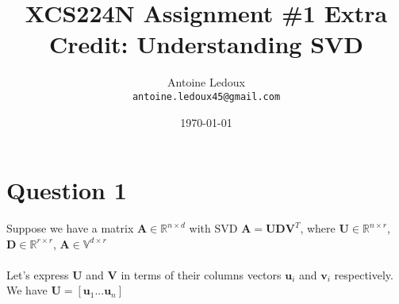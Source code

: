 \documentclass{article}
\title{XCS224N Assignment \#1 Extra Credit:
Understanding SVD } %
\author{Antoine Ledoux\\ \texttt{antoine.ledoux45@gmail.com}} %
\date{\today} %
\begin{document}
\maketitle %



\section{Question 1} %
\let\oldhat\hat
Suppose we have a matrix $\mathbf{A} \in \mathbb{R}^{n \times d} $ with SVD $\mathbf{A} = \mathbf{U} \mathbf{D} \mathbf{V} ^T$, where $\mathbf{U} \in \mathbb{R}^{n \times r} $, $\mathbf{D} \in \mathbb{R}^{r \times r} $, $\mathbf{A} \in \mathbb{V}^{d \times r} $
\\
\\
Let's express $\mathbf{U} $ and $\mathbf{V} $ in terms of their columns vectors $\mathbf{u}_i $ and $\mathbf{v}_i $ respectively.
\\
We have $\mathbf{U} = [\mathbf{u}_1 ... \mathbf{u}_n ] $


\end{document}
